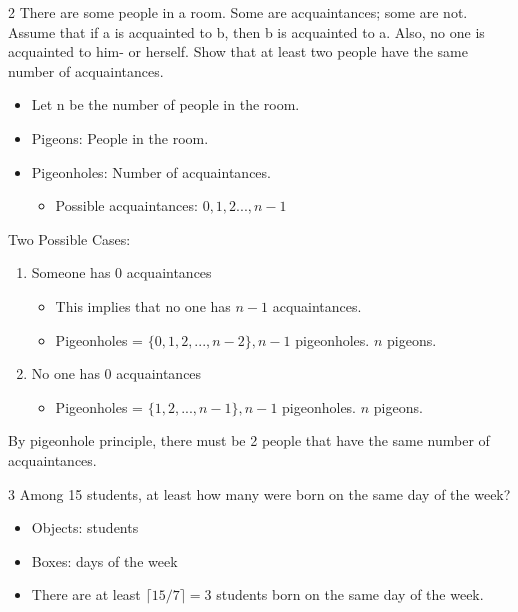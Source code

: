 \documentclass[12pt, letterpaper]{article}
\newcommand{\exheader}[1][ex]{{\tiny{#1}\normalsize}}
\newcommand{\ceil}[1]{\lceil {#1} \rceil}
\begin{document}
\pagebreak

\exheader[2] There are some people in a room. Some are acquaintances; some are not. Assume that if a is acquainted to b, then b is acquainted to a. Also, no one is acquainted to him- or herself.  Show that at least two people have the same number of acquaintances.
\begin{itemize}[leftmargin=*, label={}]
	\item Let n be the number of people in the room.
	\item Pigeons: People in the room.
	\item Pigeonholes: Number of acquaintances.
	\begin{itemize}
		\item Possible acquaintances: $0,1,2 ... , n-1$
	\end{itemize}
\end{itemize}
Two Possible Cases:
\begin{enumerate}
	\item Someone has 0 acquaintances
	\begin{itemize}[label={\faAngleRight}]
		\item {\small This implies that no one has $n-1$ acquaintances.}
		\item {\small Pigeonholes = $\{0,1,2,...,n-2\}, n-1$ pigeonholes. $n$ pigeons.}
	\end{itemize}
	\item No one has 0 acquaintances
	\begin{itemize}[label={\faAngleRight}]
		\item {\small Pigeonholes = $\{1,2,...,n-1\}, n-1$ pigeonholes. $n$ pigeons.}
	\end{itemize}
\end{enumerate}
By pigeonhole principle, there must be 2 people that have the same number of acquaintances. 

\bigbreak

\exheader[3] Among 15 students, at least how many were born on the same day of the week?
\begin{itemize}[leftmargin=*, label={}]
	\item Objects: students 
	\item Boxes: days of the week 
	\item There are at least $\ceil{15/7} = 3$ students born on the same day of the week.
\end{itemize}

\bigbreak
\end{document}
